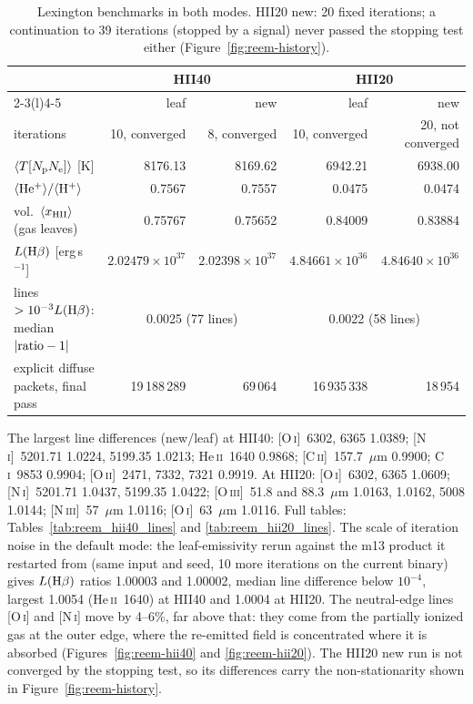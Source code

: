 \documentclass[english,a4paper]{my_memo}
\begin{document}
\begin{table}[ht]
\centering\small
\begin{tabular}{@{}lrrrr@{}}
\toprule
& \multicolumn{2}{c}{HII40} & \multicolumn{2}{c}{HII20} \\
\cmidrule(r){2-3}\cmidrule(l){4-5}
& leaf & new & leaf & new \\
\midrule
iterations & 10, converged & 8, converged & 10, converged & 20, not converged \\
$\langle T[N_{\rm p}N_{\rm e}]\rangle$ [K] & 8176.13 & 8169.62 & 6942.21 & 6938.00 \\
$\langle{\rm He^+}\rangle/\langle{\rm H^+}\rangle$ & 0.7567 & 0.7557 & 0.0475 & 0.0474 \\
vol.\ $\langle x_{\rm HII}\rangle$ (gas leaves) & 0.75767 & 0.75652 & 0.84009 & 0.83884 \\
$L({\rm H}\beta)$ [erg\,s$^{-1}$] & $2.02479\times10^{37}$ & $2.02398\times10^{37}$ &
$4.84661\times10^{36}$ & $4.84640\times10^{36}$ \\
lines $>10^{-3}L({\rm H}\beta)$: median $|{\rm ratio}-1|$ & \multicolumn{2}{c}{0.0025 (77 lines)} & \multicolumn{2}{c}{0.0022 (58 lines)} \\
explicit diffuse packets, final pass & 19\,188\,289 & 69\,064 & 16\,935\,338 & 18\,954 \\
\bottomrule
\end{tabular}
\caption{Lexington benchmarks in both modes.  HII20 new: 20 fixed
iterations; a continuation to 39 iterations (stopped by a signal) never
passed the stopping test either (Figure~\ref{fig:reem-history}).}
\label{tab:reem-lex}
\end{table}
The largest line differences (new/leaf) at HII40: [O\,\textsc{i}]~6302,
6365 1.0389; [N\,\textsc{i}]~5201.71 1.0224, 5199.35 1.0213; He\,\textsc{ii}~1640
0.9868; [C\,\textsc{ii}]~157.7~$\mu$m 0.9900; C\,\textsc{i}~9853 0.9904;
[O\,\textsc{ii}]~2471, 7332, 7321 0.9919.  At HII20: [O\,\textsc{i}]~6302,
6365 1.0609; [N\,\textsc{i}]~5201.71 1.0437, 5199.35 1.0422;
[O\,\textsc{iii}]~51.8 and 88.3~$\mu$m 1.0163, 1.0162, 5008 1.0144;
[N\,\textsc{iii}]~57~$\mu$m 1.0116; [O\,\textsc{i}]~63~$\mu$m 1.0116.  Full
tables: Tables~\ref{tab:reem_hii40_lines} and \ref{tab:reem_hii20_lines}.
The scale of iteration noise in the default mode: the leaf-emissivity rerun
against the m13 product it restarted from (same input and seed, 10 more
iterations on the current binary) gives $L({\rm H}\beta)$ ratios 1.00003
and 1.00002, median line difference below $10^{-4}$, largest 1.0054
(He\,\textsc{ii}~1640) at HII40 and 1.0004 at HII20.  The neutral-edge lines
[O\,\textsc{i}] and [N\,\textsc{i}] move by 4--6\%, far above that: they
come from the partially ionized gas at the outer edge, where the
re-emitted field is concentrated where it is absorbed
(Figures~\ref{fig:reem-hii40} and \ref{fig:reem-hii20}).  The HII20 new
run is not converged by the stopping test, so its differences carry the
non-stationarity shown in Figure~\ref{fig:reem-history}.
\end{document}
